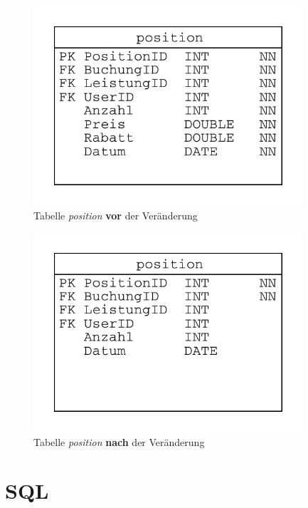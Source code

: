 \documentclass[11pt,twoside,a4paper]{article}
\begin{document}
	\begin{figure}
		\includegraphics[width=10cm]{erd_position_orig}
		\caption{Tabelle \textit{position} \textbf{vor} der Veränderung \label{fig:poso}}
	\end{figure}
	
	\begin{figure}
		\includegraphics[width=10cm]{erd_position_change}
		\caption{Tabelle \textit{position} \textbf{nach} der Veränderung \label{fig:posc}}
	\end{figure}
	
	\section{SQL}
	
	
\end{document}
